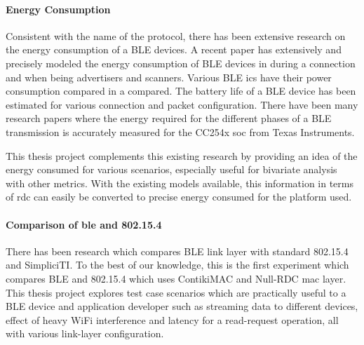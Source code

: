 \paragraph{Energy Consumption}
Consistent with the name of the protocol, there has been extensive research on the energy consumption of a BLE devices. A recent paper has extensively and precisely modeled the energy consumption of BLE devices in during a connection and when being advertisers and scanners\cite{Kindt2014}. Various BLE \glspl{ic} have their power consumption compared in a compared\cite{Bernegger2014}. The battery life of a BLE device has been estimated for various connection and packet configuration\cite{Gomez2012}. There have been many research papers where the energy required for the different phases of a BLE transmission is accurately measured\cite{Mikhaylov2013}\cite{Siekkinen2012}\cite{Mackensen2012}\cite{liu2012energy} for the CC254x \gls{soc} from Texas Instruments.

This thesis project complements this existing research by providing an idea of the energy consumed for various scenarios, especially useful for bivariate analysis with other metrics. With the existing models available, this information in terms of \gls{rdc} can easily be converted to precise energy consumed for the platform used.

\paragraph{Comparison of \texorpdfstring{\gls{ble}}{BLE} and 802.15.4} There has been research which compares BLE link layer with standard 802.15.4\cite{Mikhaylov2013}\cite{Siekkinen2012} and  SimpliciTI\cite{Mikhaylov2013}. To the best of our knowledge, this is the first experiment which compares BLE and 802.15.4 which uses ContikiMAC and Null-RDC \gls{mac} layer. This thesis project explores test case scenarios which are practically useful to a BLE device and application developer such as streaming data to different devices, effect of heavy WiFi interference and latency for a read-request operation, all with various link-layer configuration. 